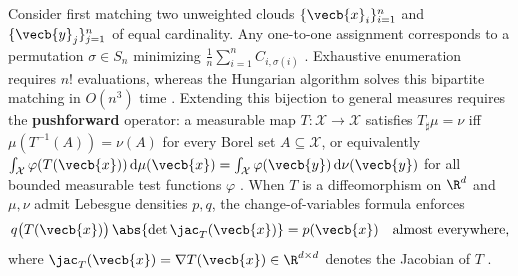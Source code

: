 \documentclass[../../../../master.tex]{subfiles}
\begin{document}
Consider first matching two unweighted clouds $\{\vecb{x}_i\}_{i=1}^n$ and $\{\vecb{y}_j\}_{j=1}^n$ of equal cardinality. Any one-to-one assignment corresponds to a permutation $\sigma \in S_n$ minimizing $\frac{1}{n}\sum_{i=1}^n C_{i,\sigma(i)}$  . Exhaustive enumeration requires $n!$ evaluations, whereas the Hungarian algorithm solves this bipartite matching in $O(n^3)$ time . Extending this bijection to general measures requires the \textbf{pushforward} operator: a measurable map $T : \mathcal{X} \to \mathcal{X}$ satisfies $T_\sharp \mu = \nu$ iff $\mu(T^{-1}(A)) = \nu(A)$ for every Borel set $A \subseteq \mathcal{X}$, or equivalently $\int_{\mathcal{X}} \varphi(T(\vecb{x}))\,\mathrm{d}\mu(\vecb{x}) = \int_{\mathcal{X}} \varphi(\vecb{y})\,\mathrm{d}\nu(\vecb{y})$ for all bounded measurable test functions $\varphi$ . When $T$ is a diffeomorphism on $\R^d$ and $\mu, \nu$ admit Lebesgue densities $p, q$, the change-of-variables formula enforces
\begin{equation}
\label{eq:ot:pushforward_jacobian}
  q\bigl(T(\vecb{x})\bigr)\,\abs{\det \jac_T(\vecb{x})} = p(\vecb{x}) \quad \text{almost everywhere,}
\end{equation}
where $\jac_T(\vecb{x}) = \nabla T(\vecb{x}) \in \R^{d \times d}$ denotes the Jacobian of $T$  .
\end{document}
